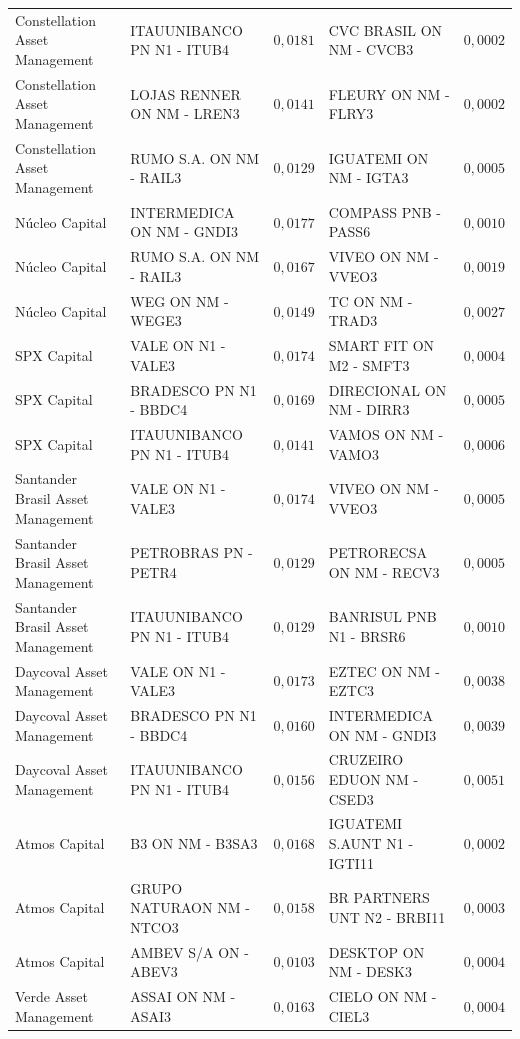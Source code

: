 \documentclass[11pt,a4paper]{article}
\begin{document}
\begin{center}
\begin{longtable}{@{}lp{3.9cm}rp{3.9cm}r@{}}
Constellation Asset Management & ITAUUNIBANCO PN N1 - ITUB4 & $0{,}0181$ & CVC BRASIL ON NM - CVCB3 & $0{,}0002$ \\
Constellation Asset Management & LOJAS RENNER ON NM - LREN3 & $0{,}0141$ & FLEURY ON NM - FLRY3 & $0{,}0002$ \\
Constellation Asset Management & RUMO S.A. ON NM - RAIL3 & $0{,}0129$ & IGUATEMI ON NM - IGTA3 & $0{,}0005$ \\
Núcleo Capital & INTERMEDICA ON NM - GNDI3 & $0{,}0177$ & COMPASS PNB - PASS6 & $0{,}0010$ \\
Núcleo Capital & RUMO S.A. ON NM - RAIL3 & $0{,}0167$ & VIVEO ON NM - VVEO3 & $0{,}0019$ \\
Núcleo Capital & WEG ON NM - WEGE3 & $0{,}0149$ & TC ON NM - TRAD3 & $0{,}0027$ \\
SPX Capital & VALE ON N1 - VALE3 & $0{,}0174$ & SMART FIT ON M2 - SMFT3 & $0{,}0004$ \\
SPX Capital & BRADESCO PN N1 - BBDC4 & $0{,}0169$ & DIRECIONAL ON NM - DIRR3 & $0{,}0005$ \\
SPX Capital & ITAUUNIBANCO PN N1 - ITUB4 & $0{,}0141$ & VAMOS ON NM - VAMO3 & $0{,}0006$ \\
Santander Brasil Asset Management & VALE ON N1 - VALE3 & $0{,}0174$ & VIVEO ON NM - VVEO3 & $0{,}0005$ \\
Santander Brasil Asset Management & PETROBRAS PN - PETR4 & $0{,}0129$ & PETRORECSA ON NM - RECV3 & $0{,}0005$ \\
Santander Brasil Asset Management & ITAUUNIBANCO PN N1 - ITUB4 & $0{,}0129$ & BANRISUL PNB N1 - BRSR6 & $0{,}0010$ \\
Daycoval Asset Management & VALE ON N1 - VALE3 & $0{,}0173$ & EZTEC ON NM - EZTC3 & $0{,}0038$ \\
Daycoval Asset Management & BRADESCO PN N1 - BBDC4 & $0{,}0160$ & INTERMEDICA ON NM - GNDI3 & $0{,}0039$ \\
Daycoval Asset Management & ITAUUNIBANCO PN N1 - ITUB4 & $0{,}0156$ & CRUZEIRO EDUON NM - CSED3 & $0{,}0051$ \\
Atmos Capital & B3 ON NM - B3SA3 & $0{,}0168$ & IGUATEMI S.AUNT N1 - IGTI11 & $0{,}0002$ \\
Atmos Capital & GRUPO NATURAON NM - NTCO3 & $0{,}0158$ & BR PARTNERS UNT N2 - BRBI11 & $0{,}0003$ \\
Atmos Capital & AMBEV S/A ON - ABEV3 & $0{,}0103$ & DESKTOP ON NM - DESK3 & $0{,}0004$ \\
Verde Asset Management & ASSAI ON NM - ASAI3 & $0{,}0163$ & CIELO ON NM - CIEL3 & $0{,}0004$ \\

\end{longtable}
\end{center}
\end{document}
